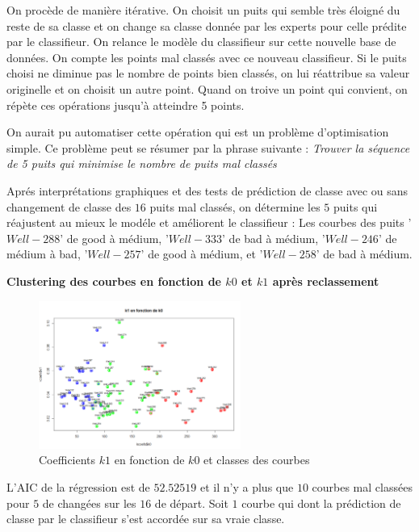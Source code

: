 \documentclass[12pt]{article}
\begin{document}
On procède de manière itérative. On choisit un puits qui semble très éloigné du reste de sa classe et on change sa classe donnée par les experts pour celle prédite par le classifieur. On relance le modèle du classifieur sur cette nouvelle base de données. On compte les points mal classés avec ce nouveau classifieur. Si le puits choisi ne diminue pas le nombre de points bien classés, on lui réattribue sa valeur originelle et on choisit un autre point. Quand on troive un point qui convient, on répète ces opérations jusqu'à atteindre 5 points.
\newline

On aurait pu automatiser cette opération qui est un problème d'optimisation simple. Ce problème peut se résumer par la phrase suivante :
\newline
\textit{Trouver la séquence de 5 puits qui minimise le nombre de puits mal classés}
\newline

Apr\'es interpr\'etations graphiques et des tests de pr\'ediction de classe avec ou sans changement de classe des $16$ puits mal class\'es, on d\'etermine les $5$ puits qui r\'eajustent au mieux le mod\'ele et am\'eliorent le classifieur :
\newline
Les courbes des puits '$Well-288$' de good à médium, '$Well-333$' de bad à médium, '$Well-246$' de médium à bad, '$Well-257$' de good à médium, et '$Well-258$' de bad à médium.

\textbf{Clustering des courbes en fonction de $k0$ et $k1$ apr\`es reclassement}

\begin{figure}[H]
 \centering %
	\includegraphics[width=250px]{clustering2}
  \caption{\label{fig:k0_k1} Coefficients $k1$ en fonction de $k0$ et classes des courbes}
\end{figure}

L'AIC de la r\'egression est de $52.52519$ et il n'y a plus que $10$ courbes mal class\'ees pour $5$ de chang\'ees sur les $16$ de d\'epart. Soit $1$ courbe qui dont la pr\'ediction de classe par le classifieur s'est accord\'ee sur sa vraie classe. 
\newline
\end{document}

